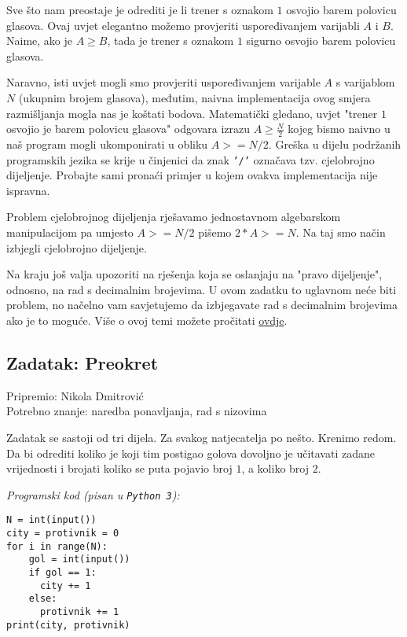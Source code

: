 \documentclass[a4paper]{article}
\begin{document}
Sve što nam preostaje je odrediti je li trener s oznakom $1$ osvojio barem
polovicu glasova. Ovaj uvjet elegantno možemo provjeriti uspoređivanjem
varijabli $A$ i $B$. Naime, ako je $A \ge B$, tada je trener s oznakom $1$
sigurno osvojio barem polovicu glasova.

Naravno, isti uvjet mogli smo provjeriti uspoređivanjem varijable $A$ s
varijablom $N$ (ukupnim brojem glasova), međutim, naivna implementacija
ovog smjera razmišljanja mogla nas je koštati bodova. Matematički gledano,
uvjet "trener $1$ osvojio je barem polovicu glasova" odgovara izrazu
$A \ge \frac{N}{2}$ kojeg bismo naivno u naš program mogli ukomponirati
u obliku $A >= N / 2$. Greška u dijelu podržanih programskih jezika se krije
u činjenici da znak \texttt{'/'} označava tzv. cjelobrojno dijeljenje. Probajte
sami pronaći primjer u kojem ovakva implementacija nije ispravna.

Problem cjelobrojnog dijeljenja rješavamo jednostavnom algebarskom manipulacijom
pa umjesto $A >= N / 2$ pišemo $2 * A >= N$. Na taj smo način izbjegli
cjelobrojno dijeljenje.

Na kraju još valja upozoriti na rješenja koja se oslanjaju na "pravo dijeljenje",
odnosno, na rad s decimalnim brojevima. U ovom zadatku to uglavnom neće biti
problem, no načelno vam savjetujemo da izbjegavate rad s decimalnim brojevima
ako je to moguće. Više o ovoj temi možete pročitati
\href{http://wiki.xfer.hr/art_epsilon/}{ovdje}.

\subsection*{Zadatak: Preokret}
\textsf{Pripremio: Nikola Dmitrović}\\
\textsf{Potrebno znanje: naredba ponavljanja, rad s nizovima}

Zadatak se sastoji od tri dijela. Za svakog natjecatelja po nešto.  Krenimo
redom. Da bi odrediti koliko je koji tim postigao golova dovoljno je učitavati
zadane vrijednosti i brojati koliko se puta pojavio broj $1$, a koliko broj $2$.

\textit{Programski kod (pisan u \texttt{Python 3}):}

\vspace{-2ex}
\begin{verbatim}
N = int(input())
city = protivnik = 0
for i in range(N):
    gol = int(input())
    if gol == 1:
      city += 1
    else:
      protivnik += 1
print(city, protivnik)
\end{verbatim}
\end{document}
